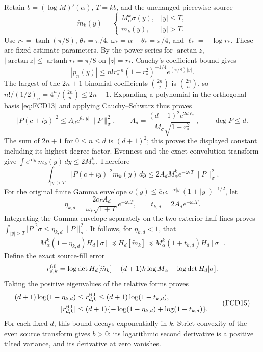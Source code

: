 Retain \(b=(\log M)'(\alpha)\), \(T=kb\), and the unchanged
piecewise source
\[
 \widetilde m_k(y)=
 \begin{cases}M_\alpha^k\sigma(y),&|y|\le T,\\
 m_k(y),&|y|>T.
 \end{cases}
\]
Use \(r_*=\tanh(\pi/8)\), \(\theta_*=\pi/4\),
\(\omega_*=\alpha-\theta_*=\pi/4\), and
\(\ell_*=-\log r_*\). These are fixed estimate parameters.
By the power series for \(\arctan z\),
\(|\arctan z|\le\operatorname{artanh}r_*=\pi/8\) on \(|z|=r_*\).
Cauchy's coefficient bound gives
\[
 |p_n(y)|\le n!r_*^{-n}(1-r_*^2)^{-1/4}
                                    e^{(\pi/8)|y|}.
\]
The largest of the \(2n+1\) binomial coefficients
\(\binom{2n}{j}\) is \(\binom{2n}{n}\), so
\(n!/(1/2)_n=4^n/\binom{2n}{n}\le2n+1\).
Expanding a polynomial in the orthogonal basis \eqref{eq:FCD13}
and applying Cauchy--Schwarz thus proves
\[
 |P(c+iy)|^2\le A_d e^{\theta_*|y|}\|P\|_\sigma^2,\qquad
 A_d=\frac{(d+1)^2e^{2d\ell_*}}
             {M_\sigma\sqrt{1-r_*^2}},
       \qquad \deg P\le d .
\]
The sum of \(2n+1\) for \(0\le n\le d\) is \((d+1)^2\);
this proves the displayed constant including its highest-degree factor.
Evenness and the exact convolution transform give
\(\int e^{\alpha|y|}m_k(y)\,dy\le2M_\alpha^k\).
Therefore
\[
 \int_{|y|>T}|P(c+iy)|^2m_k(y)\,dy
  \le2A_dM_\alpha^ke^{-\omega_*T}\|P\|_\sigma^2 .
\]
For the original finite Gamma envelope
\(\sigma(y)\le\overline c_\Gamma
e^{-\alpha|y|}(1+|y|)^{-1/2}\), let
\[
 \eta_{k,d}=\frac{2\overline c_\Gamma A_d}
                 {\omega_*\sqrt{1+T}}e^{-\omega_*T},
 \qquad t_{k,d}=2A_de^{-\omega_*T}.
\]
Integrating the Gamma envelope separately on the two exterior half-lines
proves
\(\int_{|y|>T}|P|^2\sigma\le\eta_{k,d}\|P\|_\sigma^2\).
It follows, for \(\eta_{k,d}<1\), that
\[
 M_\alpha^k(1-\eta_{k,d})H_d[\sigma]
  \preceq H_d[\widetilde m_k]
  \preceq M_\alpha^k(1+t_{k,d})H_d[\sigma].
\]
Define the exact source-fill error
\[
 r_{d,k}^{\rm fill}
   =\log\det H_d[\widetilde m_k]
        -(d+1)k\log M_\alpha-\log\det H_d[\sigma].
\]
Taking the positive eigenvalues of the relative forms proves
\begin{equation}
 \begin{split}
 (d+1)\log(1-\eta_{k,d})
       &\le r_{d,k}^{\rm fill}
                 \le(d+1)\log(1+t_{k,d}),\\
 |r_{d,k}^{\rm fill}|
       &\le(d+1)\{-\log(1-\eta_{k,d})+\log(1+t_{k,d})\}.
 \end{split}
 \tag{FCD15}\label{eq:FCD15}
\end{equation}
For each fixed \(d\), this bound decays exponentially in \(k\).
Strict convexity of the even source transform gives \(b>0\):
its logarithmic second derivative is a positive tilted variance, and
its derivative at zero vanishes.

